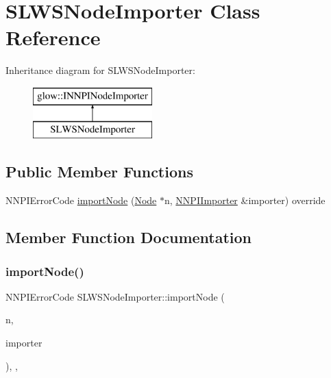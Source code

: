 \hypertarget{class_s_l_w_s_node_importer}{}\section{S\+L\+W\+S\+Node\+Importer Class Reference}
\label{class_s_l_w_s_node_importer}
Inheritance diagram for S\+L\+W\+S\+Node\+Importer\+:\begin{figure}[H]
\begin{center}
\leavevmode
\includegraphics[height=2.000000cm]{class_s_l_w_s_node_importer}
\end{center}
\end{figure}
\subsection*{Public Member Functions}
\begin{DoxyCompactItemize}
\item 
N\+N\+P\+I\+Error\+Code \hyperlink{class_s_l_w_s_node_importer_a2f0eab71e5d41ace55e85899895aad83}{import\+Node} (\hyperlink{classglow_1_1_node}{Node} $\ast$n, \hyperlink{classglow_1_1_n_n_p_i_importer}{N\+N\+P\+I\+Importer} \&importer) override
\end{DoxyCompactItemize}


\subsection{Member Function Documentation}
\mbox{\label{class_s_l_w_s_node_importer_a2f0eab71e5d41ace55e85899895aad83}} 
\subsubsection{\texorpdfstring{import\+Node()}{importNode()}}
{\footnotesize\ttfamily N\+N\+P\+I\+Error\+Code S\+L\+W\+S\+Node\+Importer\+::import\+Node (\begin{DoxyParamCaption}\item[{\hyperlink{classglow_1_1_node}{Node} $\ast$}]{n,  }\item[{\hyperlink{classglow_1_1_n_n_p_i_importer}{N\+N\+P\+I\+Importer} \&}]{importer }\end{DoxyParamCaption})\hspace{0.3cm}{\ttfamily [inline]}, {\ttfamily [override]}, {\ttfamily [virtual]}}

